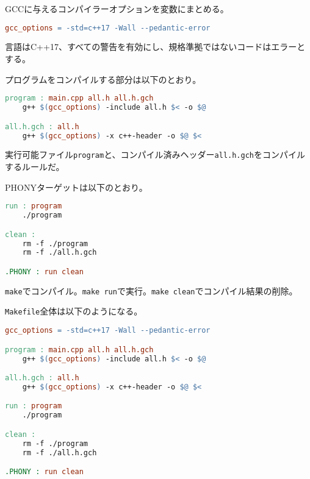 GCCに与えるコンパイラーオプションを変数にまとめる。

\begin{lstlisting}[language=make]
gcc_options = -std=c++17 -Wall --pedantic-error
\end{lstlisting}

言語はC++17、すべての警告を有効にし、規格準拠ではないコードはエラーとする。

プログラムをコンパイルする部分は以下のとおり。

\begin{lstlisting}[language=make]
program : main.cpp all.h all.h.gch
    g++ $(gcc_options) -include all.h $< -o $@

all.h.gch : all.h
    g++ $(gcc_options) -x c++-header -o $@ $<
\end{lstlisting}

実行可能ファイル\texttt{program}と、コンパイル済みヘッダー\texttt{all.h.gch}をコンパイルするルールだ。

PHONYターゲットは以下のとおり。

\begin{lstlisting}[language=make]
run : program
    ./program

clean :
    rm -f ./program
    rm -f ./all.h.gch

.PHONY : run clean
\end{lstlisting}

\texttt{make}でコンパイル。\texttt{make run}で実行。\texttt{make clean}でコンパイル結果の削除。

\texttt{Makefile}全体は以下のようになる。

\begin{lstlisting}[language=make]
gcc_options = -std=c++17 -Wall --pedantic-error

program : main.cpp all.h all.h.gch
    g++ $(gcc_options) -include all.h $< -o $@

all.h.gch : all.h
    g++ $(gcc_options) -x c++-header -o $@ $<

run : program
    ./program

clean :
    rm -f ./program
    rm -f ./all.h.gch

.PHONY : run clean
\end{lstlisting}

